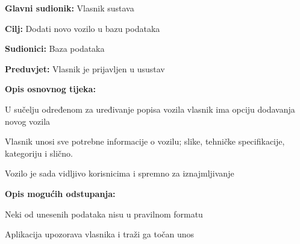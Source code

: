 					\noindent {}
					\begin{packed_item}
	
						\item \textbf{Glavni sudionik: }Vlasnik sustava
						\item  \textbf{Cilj: }Dodati novo vozilo u bazu podataka
						\item  \textbf{Sudionici: }Baza podataka
						\item  \textbf{Preduvjet: }Vlasnik je prijavljen u usustav
						\item  \textbf{Opis osnovnog tijeka:}
						
						\item[] \begin{packed_enum}
							\item U sučelju određenom za uređivanje popisa vozila vlasnik ima opciju dodavanja novog vozila
							\item Vlasnik unosi sve potrebne informacije o vozilu; slike, tehničke specifikacije, kategoriju i slično.
							\item Vozilo je sada vidljivo korisnicima i spremno za iznajmljivanje
						\end{packed_enum}
						
						\item  \textbf{Opis mogućih odstupanja: }
						
						\item[] \begin{packed_item}
	
							\item[2.a] Neki od unesenih podataka nisu u pravilnom formatu
							\item[] \begin{packed_enum}
								\item Aplikacija upozorava vlasnika i traži ga točan unos
							\end{packed_enum}
						\end{packed_item}
					\end{packed_item}
					
